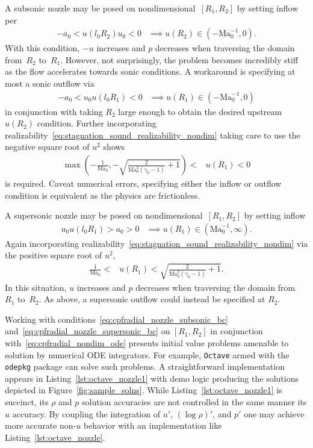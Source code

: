 \documentclass[letterpaper,11pt,nointlimits,reqno]{amsart}
\newcommand{\Mach}[1][]{\mbox{Ma}_{#1}}
\begin{document}
A subsonic nozzle may be posed on nondimensional~$\left[R_{1}, R_{2}\right]$ by
setting inflow per
\begin{align}
    -a_0 < u\!\left(l_0 R_{2}\right) u_0 < 0
    &\implies
    u\!\left(R_{2}\right) \in \left(-\Mach[0]^{-1}, 0\right)
.
\end{align}
With this condition, $-u$ increases and $p$ decreases when traversing the
domain from~$R_{2}$ to~$R_{1}$.  However, not surprisingly, the problem becomes
incredibly stiff as the flow accelerates towards sonic conditions.  A
workaround is specifying at most a sonic outflow via
\begin{align}
    -a_0 < u_0 u\!\left(l_0 R_1\right) < 0
    &\implies
    u\!\left(R_1\right) \in \left(-\Mach[0]^{-1}, 0\right)
\end{align}
in conjunction with taking $R_{2}$ large enough to obtain the desired upstream
$u\!\left(R_{2}\right)$ condition.  Further incorporating
realizability~\eqref{eq:stagnation_sound_realizability_nondim} taking care to
use the negative square root of $u^2$ shows
\begin{align}
  \max\left(
    -\frac{1}{\Mach[0]}, -\sqrt{\frac{2}{\Mach[0]^2\left(\gamma_0-1\right)}+1}
  \right) < &u\!\left(R_1\right) < 0
\label{eq:cpfradial_nozzle_subsonic_bc}
\end{align}
is required.  Caveat numerical errors, specifying either the inflow or outflow
condition is equivalent as the physics are frictionless.

A supersonic nozzle may be posed on nondimensional~$\left[R_{1}, R_{2}\right]$
by setting inflow
\begin{align}
   u_0 u\!\left(l_0 R_{1}\right) > a_0 > 0
   &\implies
   u\!\left(R_{1}\right) \in \left(\Mach[0]^{-1}, \infty\right)
.
\end{align}
Again incorporating
realizability~\eqref{eq:stagnation_sound_realizability_nondim} via the positive
square root of $u^2$,
\begin{align}
  \frac{1}{\Mach[0]} < &u\!\left(R_1\right)
  < \sqrt{\frac{2}{\Mach[0]^2\left(\gamma_0-1\right)}+1}
\label{eq:cpfradial_nozzle_supersonic_bc}
.
\end{align}
In this situation, $u$ increases and $p$ decreases when traversing the domain
from~$R_{1}$ to~$R_{2}$.  As above, a supersonic outflow could instead be
specified at $R_{2}$.

Working with conditions~\eqref{eq:cpfradial_nozzle_subsonic_bc}
and~\eqref{eq:cpfradial_nozzle_supersonic_bc} on $\left[R_1, R_2\right]$ in
conjunction with~\eqref{eq:cpfradial_nondim_ode} presents initial value
problems amenable to solution by numerical ODE integrators.  For example,
\texttt{Octave}\citep{Eaton2008GNU} armed with the \texttt{odepkg} package can
solve such problems.  A straightforward implementation appears in
Listing~\ref{lst:octave_nozzle1} with demo logic producing the solutions
depicted in Figure~\ref{fig:sample_solns}.  While
Listing~\ref{lst:octave_nozzle1} is succinct, its $\rho$ and $p$ solution
accuracies are not controlled in the same manner its $u$ accuracy.  By coupling
the integration of $u'$, $\left(\log\rho\right)'$, and $p'$ one may achieve
more accurate non-$u$ behavior with an implementation like
Listing~\ref{lst:octave_nozzle}.
\end{document}
